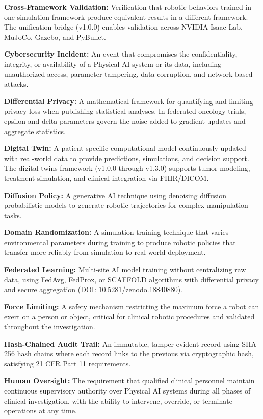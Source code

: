 \textbf{Cross-Framework Validation:} Verification that robotic behaviors trained in one simulation framework produce equivalent results in a different framework. The unification bridge (v1.0.0) enables validation across NVIDIA Isaac Lab, MuJoCo, Gazebo, and PyBullet.

\textbf{Cybersecurity Incident:} An event that compromises the confidentiality, integrity, or availability of a Physical AI system or its data, including unauthorized access, parameter tampering, data corruption, and network-based attacks.

\textbf{Differential Privacy:} A mathematical framework for quantifying and limiting privacy loss when publishing statistical analyses. In federated oncology trials, epsilon and delta parameters govern the noise added to gradient updates and aggregate statistics.

\textbf{Digital Twin:} A patient-specific computational model continuously updated with real-world data to provide predictions, simulations, and decision support. The digital twins framework (v1.0.0 through v1.3.0) supports tumor modeling, treatment simulation, and clinical integration via FHIR/DICOM.

\textbf{Diffusion Policy:} A generative AI technique using denoising diffusion probabilistic models to generate robotic trajectories for complex manipulation tasks.

\textbf{Domain Randomization:} A simulation training technique that varies environmental parameters during training to produce robotic policies that transfer more reliably from simulation to real-world deployment.

\textbf{Federated Learning:} Multi-site AI model training without centralizing raw data, using FedAvg, FedProx, or SCAFFOLD algorithms with differential privacy and secure aggregation (DOI: 10.5281/zenodo.18840880).

\textbf{Force Limiting:} A safety mechanism restricting the maximum force a robot can exert on a person or object, critical for clinical robotic procedures and validated throughout the investigation.

\textbf{Hash-Chained Audit Trail:} An immutable, tamper-evident record using SHA-256 hash chains where each record links to the previous via cryptographic hash, satisfying 21 CFR Part 11 requirements.

\textbf{Human Oversight:} The requirement that qualified clinical personnel maintain continuous supervisory authority over Physical AI systems during all phases of clinical investigation, with the ability to intervene, override, or terminate operations at any time.

